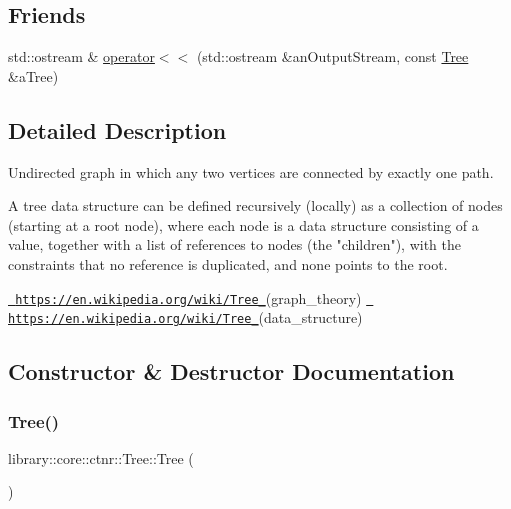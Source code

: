 \subsection*{Friends}
\begin{DoxyCompactItemize}
\item 
std\+::ostream \& \mbox{\hyperlink{classlibrary_1_1core_1_1ctnr_1_1_tree_aca74cf66509d8f31b83b1c100cb00bea}{operator$<$$<$}} (std\+::ostream \&an\+Output\+Stream, const \mbox{\hyperlink{classlibrary_1_1core_1_1ctnr_1_1_tree}{Tree}} \&a\+Tree)
\end{DoxyCompactItemize}


\subsection{Detailed Description}
Undirected graph in which any two vertices are connected by exactly one path. 

\begin{DoxyVerb}                        A tree data structure can be defined recursively (locally) as a collection of nodes (starting at a root node),
                        where each node is a data structure consisting of a value, together with a list of references to nodes (the "children"),
                        with the constraints that no reference is duplicated, and none points to the root.
\end{DoxyVerb}


\href{https://en.wikipedia.org/wiki/Tree_}{\texttt{ https\+://en.\+wikipedia.\+org/wiki/\+Tree\+\_\+}}(graph\+\_\+theory) \href{https://en.wikipedia.org/wiki/Tree_}{\texttt{ https\+://en.\+wikipedia.\+org/wiki/\+Tree\+\_\+}}(data\+\_\+structure) 

\subsection{Constructor \& Destructor Documentation}
\mbox{\label{classlibrary_1_1core_1_1ctnr_1_1_tree_a4bba7cf8925135d1fe4f24fabd07aec4}} 
\subsubsection{\texorpdfstring{Tree()}{Tree()}\hspace{0.1cm}{\footnotesize\ttfamily [1/2]}}
{\footnotesize\ttfamily library\+::core\+::ctnr\+::\+Tree\+::\+Tree (\begin{DoxyParamCaption}{ }\end{DoxyParamCaption})\hspace{0.3cm}{\ttfamily [delete]}}

